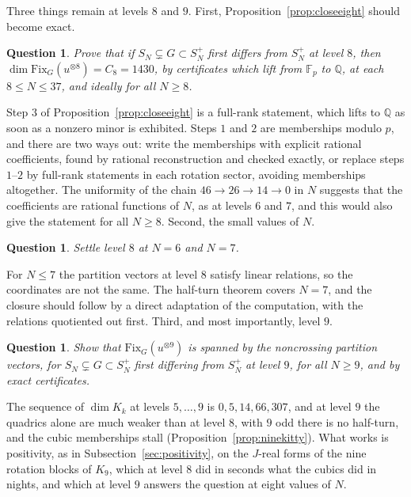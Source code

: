 \documentclass[11pt]{amsart}
\newtheorem{question}[theorem]{Question}
\theoremstyle{definition}
\theoremstyle{remark}
\theoremstyle{plain}
\numberwithin{equation}{section}
\numberwithin{table}{section}
\newcommand{\Q}{\mathbb Q}
\newcommand{\F}{\mathbb F}
\newcommand{\Fix}{\mathrm{Fix}}
\begin{document}
Three things remain at levels $8$ and $9$. First, Proposition~\ref{prop:closeeight} should become exact.

\begin{question}\label{qu:eightexact}
Prove that if $S_N\subsetneq G\subset S_N^+$ first differs from $S_N^+$ at level $8$, then $\dim\Fix_G(u^{\otimes8})=C_8=1430$, by certificates which lift from $\F_p$ to $\Q$, at each $8\le N\le37$, and ideally for all $N\ge8$.
\end{question}

Step $3$ of Proposition~\ref{prop:closeeight} is a full-rank statement, which lifts to $\Q$ as soon as a nonzero minor is exhibited. Steps $1$ and $2$ are memberships modulo $p$, and there are two ways out: write the memberships with explicit rational coefficients, found by rational reconstruction and checked exactly, or replace steps $1$--$2$ by full-rank statements in each rotation sector, avoiding memberships altogether. The uniformity of the chain $46\to26\to14\to0$ in $N$ suggests that the coefficients are rational functions of $N$, as at levels $6$ and $7$, and this would also give the statement for all $N\ge8$. Second, the small values of $N$.

\begin{question}\label{qu:eightsmall}
Settle level $8$ at $N=6$ and $N=7$.
\end{question}

For $N\le7$ the partition vectors at level $8$ satisfy linear relations, so the coordinates are not the same. The half-turn theorem covers $N=7$, and the closure should follow by a direct adaptation of the computation, with the relations quotiented out first. Third, and most importantly, level $9$.

\begin{question}\label{qu:nine}
Show that $\Fix_G(u^{\otimes9})$ is spanned by the noncrossing partition vectors, for $S_N\subsetneq G\subset S_N^+$ first differing from $S_N^+$ at level $9$, for all $N\ge9$, and by exact certificates.
\end{question}

The sequence of $\dim K_k$ at levels $5,\dots,9$ is $0,5,14,66,307$, and at level $9$ the quadrics alone are much weaker than at level $8$, with $9$ odd there is no half-turn, and the cubic memberships stall (Proposition~\ref{prop:ninekitty}). What works is positivity, as in Subsection~\ref{sec:positivity}, on the $J$-real forms of the nine rotation blocks of $K_9$, which at level $8$ did in seconds what the cubics did in nights, and which at level $9$ answers the question at eight values of $N$.
\end{document}
